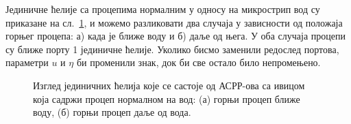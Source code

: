 \documentclass[main.tex]{subfiles}
\begin{document}
Јединичне ћелије са процепима нормалним у односу на микрострип вод су приказане на сл.~\ref{norm_gep}, и можемо разликовати два случаја у зависности од положаја горњег процепа: а) када је ближе воду и б) даље од њега. У оба случаја процепи су ближе порту 1 јединичне ћелије. Уколико бисмо заменили редослед портова, параметри $u$ и $\eta$ би променили знак, док би све остало било непромењено.
\begin{figure}[!t]
\hfill
{}
\caption{Изглед јединичних ћелија које се састоје од АСРР-ова са ивицом која садржи процеп нормалном на вод: (а) горњи процеп ближе воду, (б) горњи процеп даље од вода.}
\label{norm_gep}
\end{figure}
\end{document}
